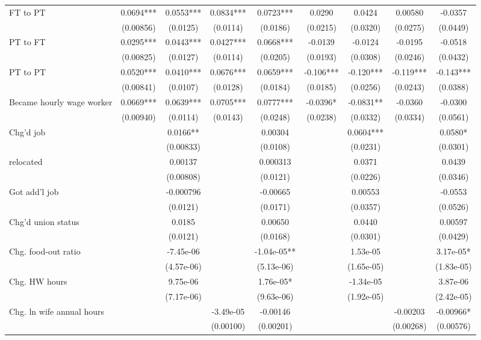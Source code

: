 \begin{tabular}{lcccccccc}
FT to PT & 0.0694*** & 0.0553*** & 0.0834*** & 0.0723*** & 0.0290 & 0.0424 & 0.00580 & -0.0357 \\
 & (0.00856) & (0.0125) & (0.0114) & (0.0186) & (0.0215) & (0.0320) & (0.0275) & (0.0449) \\
PT to FT & 0.0295*** & 0.0443*** & 0.0427*** & 0.0668*** & -0.0139 & -0.0124 & -0.0195 & -0.0518 \\
 & (0.00825) & (0.0127) & (0.0114) & (0.0205) & (0.0193) & (0.0308) & (0.0246) & (0.0432) \\
PT to PT & 0.0520*** & 0.0410*** & 0.0676*** & 0.0659*** & -0.106*** & -0.120*** & -0.119*** & -0.143*** \\
 & (0.00841) & (0.0107) & (0.0128) & (0.0184) & (0.0185) & (0.0256) & (0.0243) & (0.0388) \\
Became hourly wage worker & 0.0669*** & 0.0639*** & 0.0705*** & 0.0777*** & -0.0396* & -0.0831** & -0.0360 & -0.0300 \\
 & (0.00940) & (0.0114) & (0.0143) & (0.0248) & (0.0238) & (0.0332) & (0.0334) & (0.0561) \\
Chg'd job &  & 0.0166** &  & 0.00304 &  & 0.0604*** &  & 0.0580* \\
 &  & (0.00833) &  & (0.0108) &  & (0.0231) &  & (0.0301) \\
relocated &  & 0.00137 &  & 0.000313 &  & 0.0371 &  & 0.0439 \\
 &  & (0.00808) &  & (0.0121) &  & (0.0226) &  & (0.0346) \\
Got add'l job &  & -0.000796 &  & -0.00665 &  & 0.00553 &  & -0.0553 \\
 &  & (0.0121) &  & (0.0171) &  & (0.0357) &  & (0.0526) \\
Chg'd union status &  & 0.0185 &  & 0.00650 &  & 0.0440 &  & 0.00597 \\
 &  & (0.0121) &  & (0.0168) &  & (0.0301) &  & (0.0429) \\
Chg. food-out ratio &  & -7.45e-06 &  & -1.04e-05** &  & 1.53e-05 &  & 3.17e-05* \\
 &  & (4.57e-06) &  & (5.13e-06) &  & (1.65e-05) &  & (1.83e-05) \\
Chg. HW hours &  & 9.75e-06 &  & 1.76e-05* &  & -1.34e-05 &  & 3.87e-06 \\
 &  & (7.17e-06) &  & (9.63e-06) &  & (1.92e-05) &  & (2.42e-05) \\
Chg. ln wife annual hours &  &  & -3.49e-05 & -0.00146 &  &  & -0.00203 & -0.00966* \\
 &  &  & (0.00100) & (0.00201) &  &  & (0.00268) & (0.00576) \\

\end{tabular}
